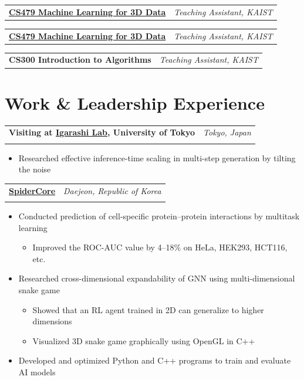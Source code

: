 \documentclass[10pt, a4paper]{article}
\makeatletter
\newlength{\datecol}
\newlength{\entrygap}
\newlength{\compactentrygap}
\newcommand{\datefmt}[1]{{\small\color{muted}#1}}
\newcommand{\locfmt}[1]{{\small\itshape\color{location}#1}}
\newcommand{\cvheadertwo}[4]{%
  \noindent
  \begin{tabularx}{\textwidth}{@{}Xr@{}}
    \makebox[\datecol][l]{\datefmt{#1}}%
    \textbf{#2} & \locfmt{#4} \\[-2pt]
    \hspace*{\datecol}{\small\itshape\color{muted}#3} &
  \end{tabularx}%
}
\newenvironment{cvlist}{%
  \begin{itemize}[
    leftmargin = \dimexpr\datecol + 0.18cm\relax,
    itemsep=1pt, parsep=0pt, topsep=3pt,
    label={\color{accent!60!white}\textbullet}
  ]
}{\end{itemize}\vspace{\entrygap}}
\newenvironment{cvsublist}{%
  \begin{itemize}[
    leftmargin=0.4cm, itemsep=0.5pt, parsep=0pt, topsep=0.5pt,
    label={\color{muted}\textendash}
  ]
  \small\color{muted}
}{\end{itemize}}
\newcommand{\teachingrow}[3]{%
  \noindent
  \begin{tabularx}{\textwidth}{@{}Xr@{}}
    \makebox[\datecol][l]{\datefmt{#1}}%
    \textbf{#2} &
    {\small\itshape\color{muted}#3}
  \end{tabularx}\vspace{\compactentrygap}%
}
\makeatother
\begin{document}
\teachingrow
  {Spring 2026}
  {\href{https://3dml.kaist.ac.kr/}{CS479 Machine Learning for 3D Data}}
  {Teaching Assistant, KAIST}

\teachingrow
  {Spring 2025}
  {\href{https://mhsung.github.io/kaist-cs479-spring-2025/}{CS479 Machine Learning for 3D Data}}
  {Teaching Assistant, KAIST}

\teachingrow
  {Fall 2024}
  {CS300 Introduction to Algorithms}
  {Teaching Assistant, KAIST}


\section{Work \& Leadership Experience}

\cvheadertwo
  {Dec.~2025\,$\sim$\,Mar.~2026}
  {Visiting at \href{https://www-ui.is.s.u-tokyo.ac.jp/}{Igarashi Lab}, University of Tokyo}{Internship Trainee}
  {Tokyo, Japan}
\begin{cvlist}
  \item Researched effective inference-time scaling in multi-step generation
        by tilting the noise
\end{cvlist}

\cvheadertwo
  {Dec.~2021\,$\sim$\,May~2023}
  {\href{http://www.spidercore.io}{SpiderCore}}{AI Development Team Intern}
  {Daejeon, Republic of Korea}
\begin{cvlist}
  \item Conducted prediction of cell-specific protein--protein interactions
        by multitask learning
  \begin{cvsublist}
    \item Improved the ROC-AUC value by 4--18\% on HeLa, HEK293, HCT116, etc.
  \end{cvsublist}
  \item Researched cross-dimensional expandability of GNN using
        multi-dimensional snake game
  \begin{cvsublist}
    \item Showed that an RL agent trained in 2D can generalize to higher dimensions
    \item Visualized 3D snake game graphically using OpenGL in C++
  \end{cvsublist}
  \item Developed and optimized Python and C++ programs to train and evaluate AI models
\end{cvlist}
\end{document}
